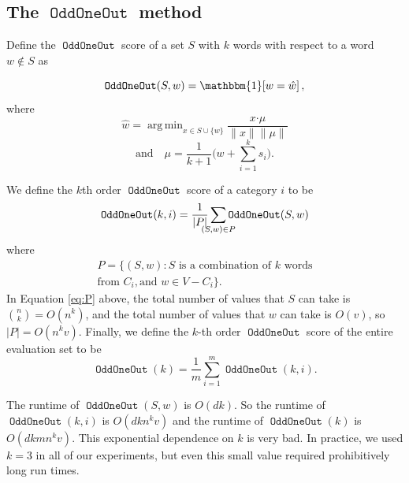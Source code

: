 \documentclass[11pt,a4paper]{article}
\newcommand{\ltwo}[1]{\lVert{#1}\rVert}
\newcommand{\indicator}[1]{\mathbbm{1}\!\left[{#1}\right]}
\DeclareMathOperator*{\argmax}{arg\,max}
\DeclareMathOperator*{\argmin}{arg\,min}
\DeclareMathOperator{\OddOneOut}{\texttt{OddOneOut}}
\DeclareMathOperator{\topk}{\texttt{Topk}}
\begin{document}
\subsection{The $\OddOneOut$ method}
Define the $\OddOneOut$ score of a set $S$ with $k$ words with respect to a word $w\not\in S$ as

\begin{equation}
    \OddOneOut(S,w) = \indicator{w = \hat w},
\end{equation}
where
\begin{equation}
	\hat w = \argmin_{x \in S\cup\{w\}} \frac{x \boldsymbol{\cdot} \mu}{\ltwo{x}\ltwo{\mu}}
\end{equation}
\begin{equation}
    \text{and}
    \quad
    \mu = \frac1{k+1}\bigg(w + \sum_{i=1}^k{s_i}\bigg)
    .
\end{equation}


We define the $k$th order $\OddOneOut$ score of a category $i$ to be
\begin{equation}
    \OddOneOut(k,i) = \frac 1 {|P|} \sum_{\mathclap{(S,w) \in P}} \OddOneOut(S,w)
    \label{eq:OOOki}
\end{equation}
where
\begin{multline}
    P = \{ (S, w) : S \text{~is a combination of $k$ words}\\\text{from $C_i$}, \text{and~} w \in V-C_i \}
    .
    \label{eq:P}
\end{multline}
In Equation \eqref{eq:P} above,
the total number of values that $S$ can take is ${n \choose k} = O(n^k)$,
and the total number of values that $w$ can take is $O(v)$,
so $|P| = O(n^kv)$.
Finally, we define the $k$-th order $\OddOneOut$ score of the entire evaluation set to be
\begin{equation}
    \OddOneOut(k) = \frac 1 m \sum_{i=1}^m \OddOneOut(k,i)
    .
\end{equation}

The runtime of $\OddOneOut(S,w)$ is $O(dk)$.
So the runtime of $\OddOneOut(k,i)$ is $O(dkn^kv)$ and the runtime of $\OddOneOut(k)$ is $O(dkmn^kv)$.
This exponential dependence on $k$ is very bad.
In practice, we used $k=3$ in all of our experiments,
but even this small value required prohibitively long run times.

\end{document}
